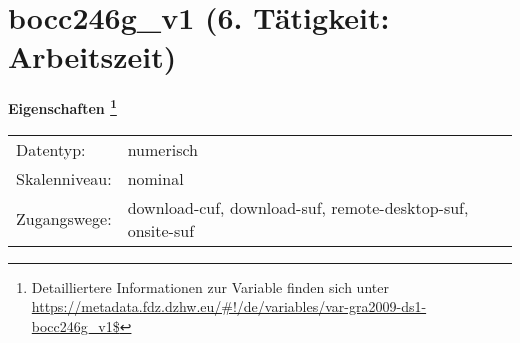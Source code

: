 
    \setcounter{footnote}{0}

    \vspace*{-1.8cm}
	\section{bocc246g\_v1 (6. Tätigkeit: Arbeitszeit)}
	\label{section:bocc246g_v1}



    \vspace*{0.5cm}
    \noindent\textbf{Eigenschaften
	\footnote{Detailliertere Informationen zur Variable finden sich unter
		\url{https://metadata.fdz.dzhw.eu/\#!/de/variables/var-gra2009-ds1-bocc246g_v1$}}}\\
	\begin{tabularx}{\hsize}{@{}lX}
	Datentyp: & numerisch \\
	Skalenniveau: & nominal \\
	Zugangswege: &
	  download-cuf, 
	  download-suf, 
	  remote-desktop-suf, 
	  onsite-suf
 \\
    \end{tabularx}




